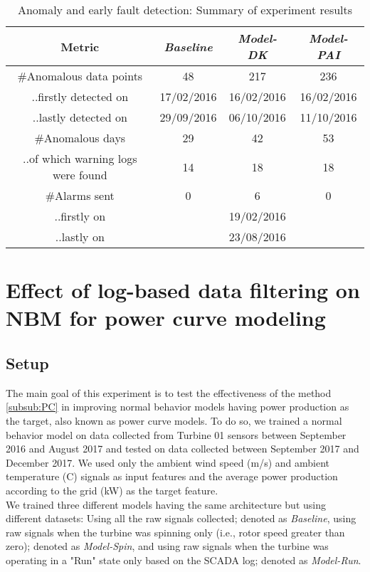 \begin{table}[H]
    \centering
    \begin{tabular}{|c|c|c|c|}
        \hline
            \textbf{Metric} & \textbf{\emph{Baseline}} & \textbf{\emph{Model-DK}} & \textbf{\emph{Model-PAI}}\\
            \hline
            \#Anomalous data points & 48 & 217 & 236\\
            \hline
            ..firstly detected on & 17/02/2016 & 16/02/2016 & 16/02/2016\\
            \hline
            ..lastly detected on & 29/09/2016 & 06/10/2016 & 11/10/2016\\
            \hline
            \#Anomalous days & 29 & 42 & 53\\
            \hline
            ..of which warning logs were found & 14 & 18 & 18\\
            \hline
            \#Alarms sent & 0 & 6 & 0\\
            \hline
            ..firstly on & \- & 19/02/2016 & \-\\
            \hline
            ..lastly on & \- & 23/08/2016 & \-\\
        \hline
    \end{tabular}
    \caption{Anomaly and early fault detection: Summary of experiment results}
    \label{tab:summary_expIII}
\end{table}

\section{Effect of log-based data filtering on NBM for power curve modeling}
    \label{sec:Experiment IV}
    \subsection{Setup}
    The main goal of this experiment is to test the effectiveness of the method \ref{subsub:PC} in improving normal behavior models 
    having power production as the target, also known as power curve models. To do so, we trained a normal behavior model on 
    data collected from Turbine 01 sensors between September 2016 and August 2017 and tested on data collected between September 2017 
    and December 2017. We used only the ambient wind speed (m/s) and ambient temperature (\degree C) signals as input features 
    and the average power production according to the grid (kW) as the target feature.\\
    We trained three different models having the same architecture but using different datasets: 
    Using all the raw signals collected; denoted as \emph{Baseline}, 
    using raw signals when the turbine was spinning only (i.e., rotor speed greater than zero); denoted as \emph{Model-Spin},
    and using raw signals when the turbine was operating in a "Run" state only based on the SCADA log; denoted as \emph{Model-Run}.\\

